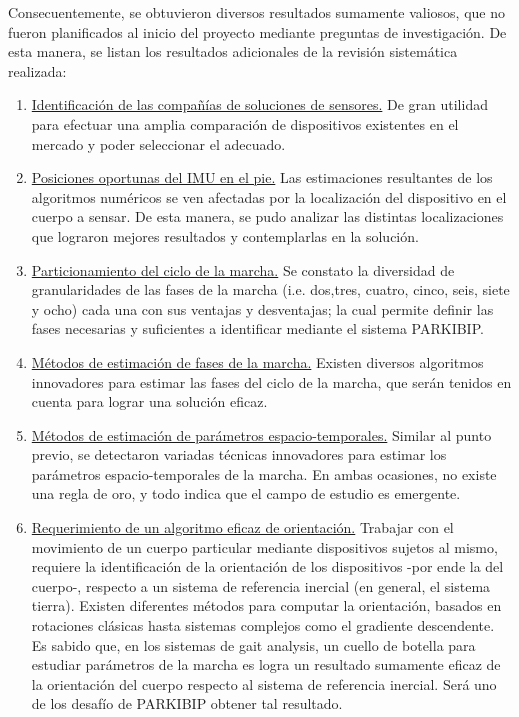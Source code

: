 Consecuentemente, se obtuvieron diversos resultados sumamente valiosos, que no fueron planificados al inicio del proyecto mediante preguntas de investigación. De esta manera, se listan los resultados adicionales de la revisión sistemática realizada:
\begin{enumerate}
    \item \underline{Identificación de las compañías de soluciones de sensores.} De gran utilidad para efectuar una amplia comparación de dispositivos existentes en el mercado y poder seleccionar el adecuado.
    \item \underline{Posiciones oportunas del IMU en el pie.} Las estimaciones resultantes de los algoritmos numéricos se ven afectadas por la localización del dispositivo en el cuerpo a sensar. De esta manera, se pudo analizar las distintas localizaciones que lograron mejores resultados y contemplarlas en la solución. 
    \item \underline{Particionamiento del ciclo de la marcha.} Se constato la diversidad de granularidades de las fases de la marcha (i.e. dos,tres, cuatro, cinco, seis, siete y ocho) cada una con sus ventajas y desventajas; la cual permite definir las fases necesarias y suficientes a identificar mediante el sistema PARKIBIP.
    \item \underline{Métodos de estimación de fases de la marcha.} Existen diversos algoritmos innovadores para estimar las fases del ciclo de la marcha, que serán tenidos en cuenta para lograr una solución eficaz.
    \item \underline{Métodos de estimación de parámetros espacio-temporales.} Similar al punto previo, se detectaron variadas técnicas innovadores para estimar los parámetros espacio-temporales de la marcha. En ambas ocasiones, no existe una regla de oro, y todo indica que el campo de estudio es emergente.
    \item \underline{Requerimiento de un algoritmo eficaz de orientación.} Trabajar con el movimiento de un cuerpo particular mediante dispositivos sujetos al mismo, requiere la identificación de la orientación de los dispositivos -por ende la del cuerpo-, respecto a un sistema de referencia inercial (en general, el sistema tierra). Existen diferentes métodos para computar la orientación, basados en rotaciones clásicas hasta sistemas complejos como el gradiente descendente. Es sabido que, en los sistemas de gait analysis, un cuello de botella para estudiar parámetros de la marcha es logra un resultado sumamente eficaz de la orientación del cuerpo respecto al sistema de referencia inercial. Será uno de los desafío de PARKIBIP obtener tal resultado.

\end{enumerate}
